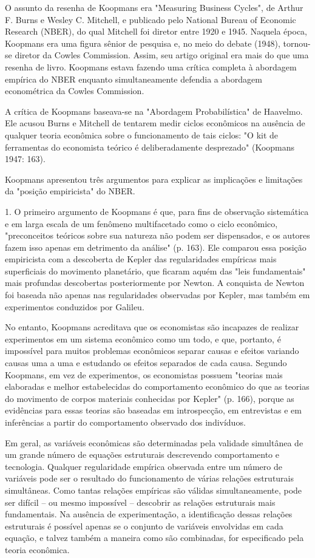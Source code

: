 \documentclass[12pt]{article}
\begin{document}
O assunto da resenha de Koopmans era "Measuring Business Cycles", de Arthur F. Burns e Wesley C. Mitchell, e publicado pelo National Bureau of Economic Research (NBER), do qual Mitchell foi diretor entre 1920 e 1945. Naquela época, Koopmans era uma figura sênior de pesquisa e, no meio do debate (1948), tornou-se diretor da Cowles Commission. Assim, seu artigo original era mais do que uma resenha de livro. Koopmans estava fazendo uma crítica completa à abordagem empírica do NBER enquanto simultaneamente defendia a abordagem econométrica da Cowles Commission.

A crítica de Koopmans baseava-se na "Abordagem Probabilística" de Haavelmo. Ele acusou Burns e Mitchell de tentarem medir ciclos econômicos na ausência de qualquer teoria econômica sobre o funcionamento de tais ciclos: "O kit de ferramentas do economista teórico é deliberadamente desprezado" (Koopmans 1947: 163).

Koopmans apresentou três argumentos para explicar as implicações e limitações da "posição empiricista" do NBER.

1. O primeiro argumento de Koopmans é que, para fins de observação sistemática e em larga escala de um fenômeno multifacetado como o ciclo econômico, "preconceitos teóricos sobre sua natureza não podem ser dispensados, e os autores fazem isso apenas em detrimento da análise" (p. 163). Ele comparou essa posição empiricista com a descoberta de Kepler das regularidades empíricas mais superficiais do movimento planetário, que ficaram aquém das "leis fundamentais" mais profundas descobertas posteriormente por Newton. A conquista de Newton foi baseada não apenas nas regularidades observadas por Kepler, mas também em experimentos conduzidos por Galileu.

No entanto, Koopmans acreditava que os economistas são incapazes de realizar experimentos em um sistema econômico como um todo, e que, portanto, é impossível para muitos problemas econômicos separar causas e efeitos variando causas uma a uma e estudando os efeitos separados de cada causa. Segundo Koopmans, em vez de experimentos, os economistas possuem "teorias mais elaboradas e melhor estabelecidas do comportamento econômico do que as teorias do movimento de corpos materiais conhecidas por Kepler" (p. 166), porque as evidências para essas teorias são baseadas em introspecção, em entrevistas e em inferências a partir do comportamento observado dos indivíduos.

Em geral, as variáveis econômicas são determinadas pela validade simultânea de um grande número de equações estruturais descrevendo comportamento e tecnologia. Qualquer regularidade empírica observada entre um número de variáveis pode ser o resultado do funcionamento de várias relações estruturais simultâneas. Como tantas relações empíricas são válidas simultaneamente, pode ser difícil – ou mesmo impossível – descobrir as relações estruturais mais fundamentais. Na ausência de experimentação, a identificação dessas relações estruturais é possível apenas se o conjunto de variáveis envolvidas em cada equação, e talvez também a maneira como são combinadas, for especificado pela teoria econômica.
\end{document}
